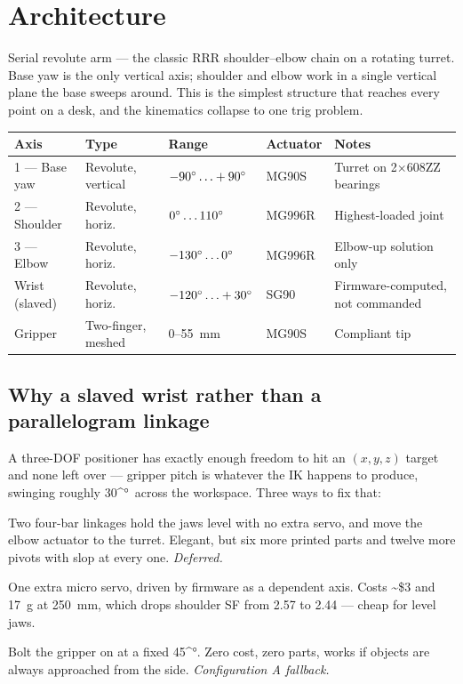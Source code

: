 \documentclass[11pt]{article}
\newcommand{\degsym}{\ifmmode{}^{\circ}\else°\fi}
\begin{document}
\section{Architecture}

Serial revolute arm --- the classic RRR shoulder--elbow chain on a rotating turret. Base yaw is the only vertical axis; shoulder and elbow work in a single vertical plane the base sweeps around. This is the simplest structure that reaches every point on a desk, and the kinematics collapse to one trig problem.

\begin{center}
\small
\begin{tabular}{@{}L{2.1cm}L{2.3cm}L{2.6cm}L{1.5cm}L{5.4cm}@{}}
\toprule
\textbf{Axis} & \textbf{Type} & \textbf{Range} & \textbf{Actuator} & \textbf{Notes} \\
 --- Base yaw & Revolute, vertical & $-90\degsym\ldots+90\degsym$ & MG90S & Turret on 2$\times$608ZZ bearings \\
2 --- Shoulder & Revolute, horiz.\ & $0\degsym\ldots110\degsym$ & MG996R & Highest-loaded joint \\
3 --- Elbow & Revolute, horiz.\ & $-130\degsym\ldots0\degsym$ & MG996R & Elbow-up solution only \\
Wrist (slaved) & Revolute, horiz.\ & $-120\degsym\ldots+30\degsym$ & SG90 & Firmware-computed, not commanded \\
Gripper & Two-finger, meshed & 0--55~mm & MG90S & Compliant tip \\
\bottomrule
\end{tabular}
\end{center}

\subsection{Why a slaved wrist rather than a parallelogram linkage}
A three-DOF positioner has exactly enough freedom to hit an $(x,y,z)$ target and none left over --- gripper pitch is whatever the IK happens to produce, swinging roughly 30\degsym\ across the workspace. Three ways to fix that:

\begin{description}[leftmargin=1.4em,style=nextline]
\item[Twin parallelogram] Two four-bar linkages hold the jaws level with no extra servo, and move the elbow actuator to the turret. Elegant, but six more printed parts and twelve more pivots with slop at every one. \emph{Deferred.}
\item[SG90 slaved wrist --- chosen] One extra micro servo, driven by firmware as a dependent axis. Costs \textasciitilde\$3 and 17~g at 250~mm, which drops shoulder SF from 2.57 to 2.44 --- cheap for level jaws.
\item[Fixed bracket] Bolt the gripper on at a fixed 45\degsym. Zero cost, zero parts, works if objects are always approached from the side. \emph{Configuration A fallback.}
\end{description}
\end{document}
